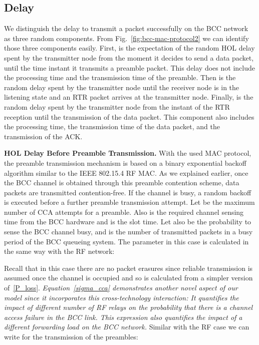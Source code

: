\documentclass[10pt]{IEEEtran}
\newcounter{section:outage-analysis}
\begin{document}
\subsection{Delay}
We distinguish the delay to transmit a packet successfully on the BCC network as three random components. From Fig.~\ref{fig:bcc-mac-protocol2} we can identify those three components easily. First,  is the expectation of the random HOL delay spent by the transmitter node from the moment it decides to send a data packet, until the time instant it transmits a preamble packet. This delay does not include the processing time and the transmission time of the preamble. Then  is the random delay spent by the transmitter node until the receiver node is in the listening state and an RTR packet arrives at the transmitter node. Finally,  is the random delay spent by the transmitter node from the instant of the RTR reception until the transmission of the data packet. This component also includes the processing time, the transmission time of the data packet, and the transmission of the ACK.

\textbf{HOL Delay Before Preamble Transmission.} With the used MAC protocol, the preamble transmission mechanism is based on a binary exponential backoff algorithm similar to the IEEE 802.15.4 RF MAC. As we explained earlier, once the BCC channel is obtained through this preamble contention scheme, data packets are transmitted contention-free. If the channel is busy, a random backoff is executed before a further preamble transmission attempt. Let  be the maximum number of CCA attempts for a preamble. Also  is the required channel sensing time from the BCC hardware and  is the slot time. Let also  be the probability to sense the BCC channel busy, and  is the number of transmitted packets in a busy period of the BCC queueing system. The parameter  in this case is calculated in the same way with the RF network:
			
Recall that in this case there are no packet erasures since reliable transmission is assumed once the channel is occupied and so  is calculated from a simpler version of~\eqref{P_loss}. \textit{Equation~\eqref{sigma_cca} demonstrates another novel aspect of our model since it incorporates this cross-technology interaction: It quantifies the impact of different number of RF relays  on the probability that there is a channel access failure in the BCC link. This expression also quantifies the impact of a different forwarding load  on the BCC network.} Similar with the RF case we can write for the transmission of the preambles:
\end{document}
